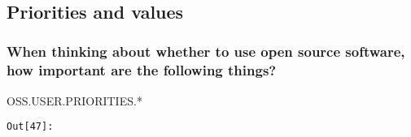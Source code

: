 \documentclass[11pt]{article}
\begin{document}
    


    \begin{center}
    \end{center}
    { \hspace*{\fill} \\}
    
    \subsection{Priorities and values}\label{priorities-and-values}

    \subsubsection{When thinking about whether to use open source software,
how important are the following
things?}\label{when-thinking-about-whether-to-use-open-source-software-how-important-are-the-following-things}

OSS.USER.PRIORITIES.*


\texttt{\color{outcolor}Out[{\color{outcolor}47}]:}
    
\end{document}
